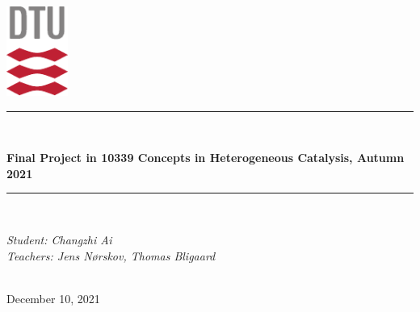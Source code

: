 \documentclass{article}
\begin{document}
\begin{titlepage}
\newcommand{\HRule}{\rule{\linewidth}{0.5mm}} %
\center %
\includegraphics[width=0.15\textwidth]{Pictures/DTU-logo.pdf}
\\[0.5cm]
\HRule \\[0.8cm]
{ \huge \bfseries Final Project in 10339 Concepts in Heterogeneous Catalysis, Autumn 2021\\[0.4cm] %
\HRule \\[3cm]
\begin{minipage}{1.\textwidth}
\begin{center} 
\emph{Student: Changzhi Ai} \\
\emph{Teachers: Jens N{\o}rskov, Thomas Bligaard} 
\end{center}
\end{minipage}\\[2cm]
{\large 
December 10, 2021
}
\\[0.2cm] %
}\end{titlepage}
\end{document}
